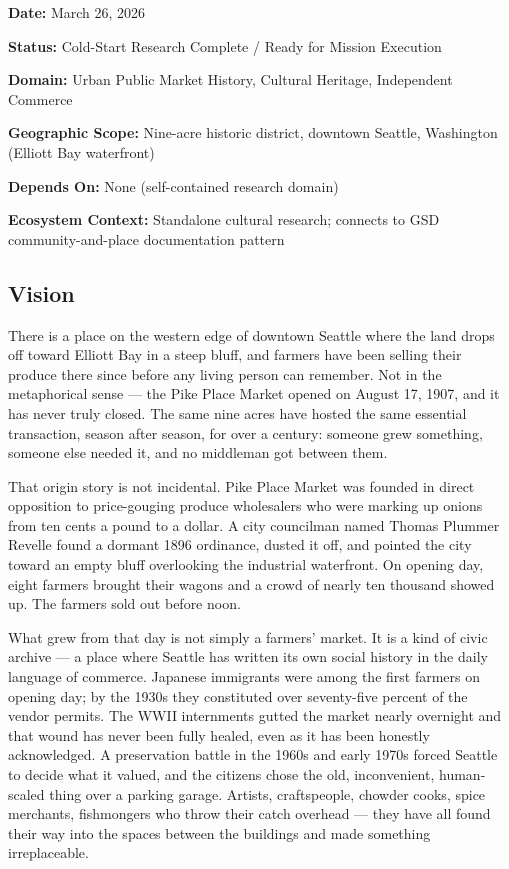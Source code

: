 \documentclass[11pt,letterpaper]{article}
\newcommand{\metafield}[2]{\textbf{\sffamily #1} #2\par}
\begin{document}
\metafield{Date:}{March 26, 2026}
\metafield{Status:}{Cold-Start Research Complete / Ready for Mission Execution}
\metafield{Domain:}{Urban Public Market History, Cultural Heritage, Independent Commerce}
\metafield{Geographic Scope:}{Nine-acre historic district, downtown Seattle, Washington (Elliott Bay waterfront)}
\metafield{Depends On:}{None (self-contained research domain)}
\metafield{Ecosystem Context:}{Standalone cultural research; connects to GSD community-and-place documentation pattern}

\subsection{Vision}

There is a place on the western edge of downtown Seattle where the land drops off toward Elliott Bay in a steep bluff, and farmers have been selling their produce there since before any living person can remember. Not in the metaphorical sense --- the Pike Place Market opened on August 17, 1907, and it has never truly closed. The same nine acres have hosted the same essential transaction, season after season, for over a century: someone grew something, someone else needed it, and no middleman got between them.

That origin story is not incidental. Pike Place Market was founded in direct opposition to price-gouging produce wholesalers who were marking up onions from ten cents a pound to a dollar. A city councilman named Thomas Plummer Revelle found a dormant 1896 ordinance, dusted it off, and pointed the city toward an empty bluff overlooking the industrial waterfront. On opening day, eight farmers brought their wagons and a crowd of nearly ten thousand showed up. The farmers sold out before noon.

What grew from that day is not simply a farmers' market. It is a kind of civic archive --- a place where Seattle has written its own social history in the daily language of commerce. Japanese immigrants were among the first farmers on opening day; by the 1930s they constituted over seventy-five percent of the vendor permits. The WWII internments gutted the market nearly overnight and that wound has never been fully healed, even as it has been honestly acknowledged. A preservation battle in the 1960s and early 1970s forced Seattle to decide what it valued, and the citizens chose the old, inconvenient, human-scaled thing over a parking garage. Artists, craftspeople, chowder cooks, spice merchants, fishmongers who throw their catch overhead --- they have all found their way into the spaces between the buildings and made something irreplaceable.
\end{document}
